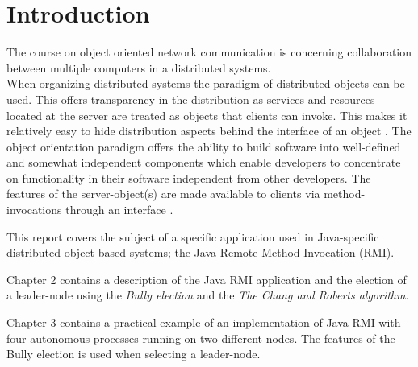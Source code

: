 \documentclass[Main]{subfiles}
\begin{document}
\chapter{Introduction}
The course on object oriented network communication is concerning collaboration between multiple computers in a distributed systems.\\
When organizing distributed systems the paradigm of distributed objects can be used. This offers transparency in the distribution as services and resources located at the server are treated as objects that clients can invoke. This makes it relatively easy to hide distribution aspects behind the interface of an object \cite[p. 443]{Tanenbaum}. The object orientation paradigm offers the ability to build software into well-defined and somewhat independent components which enable developers to concentrate on functionality in their software independent from other developers. The features of the server-object(s) are made available to clients via method-invocations through an interface \cite[p. 443-444]{Tanenbaum}.


This report covers the subject of a specific application used in Java-specific distributed object-based systems; the Java Remote Method Invocation (RMI).


Chapter 2 contains a description of the Java RMI application and the election of a leader-node using the \textit{Bully election} and the \textit{The Chang and Roberts algorithm}.


Chapter 3 contains a practical example of an implementation of Java RMI with four autonomous processes running on two different nodes. The features of the Bully election is used when selecting a leader-node.
\end{document}
